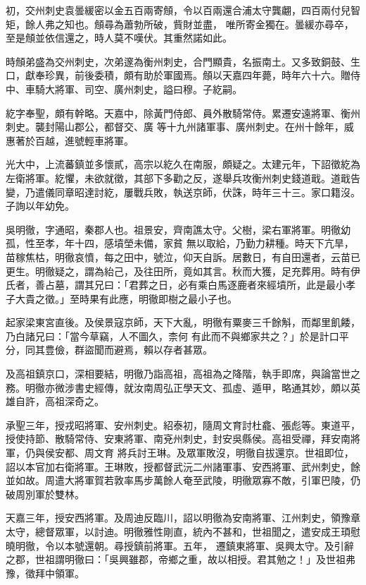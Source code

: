 \begin{pinyinscope}
 初，交州刺史袁曇緩密以金五百兩寄頠，令以百兩還合浦太守龔翽，四百兩付兒智矩，餘人弗之知也。頠尋為蕭勃所破，貲財並盡，
 唯所寄金獨在。曇緩亦尋卒，至是頠並依信還之，時人莫不嘆伏。其重然諾如此。



 時頠弟盛為交州刺史，次弟邃為衡州刺史，合門顯貴，名振南土。又多致銅鼓、生口，獻奉珍異，前後委積，頗有助於軍國焉。頠以天嘉四年薨，時年六十六。贈侍中、車騎大將軍、司空、廣州刺史，謚曰穆。子紇嗣。



 紇字奉聖，頗有幹略。天嘉中，除黃門侍郎、員外散騎常侍。累遷安遠將軍、衡州刺史。襲封陽山郡公，都督交、廣
 等十九州諸軍事、廣州刺史。在州十餘年，威惠著於百越，進號輕車將軍。



 光大中，上流蕃鎮並多懷貳，高宗以紇久在南服，頗疑之。太建元年，下詔徵紇為左衛將軍。紇懼，未欲就徵，其部下多勸之反，遂舉兵攻衡州刺史錢道戢。道戢告變，乃遣儀同章昭達討紇，屢戰兵敗，執送京師，伏誅，時年三十三。家口籍沒。子詢以年幼免。



 吳明徹，字通昭，秦郡人也。祖景安，齊南譙太守。父樹，梁右軍將軍。明徹幼孤，性至孝，年十四，感墳塋未備，家貧
 無以取給，乃勤力耕種。時天下亢旱，苗稼焦枯，明徹哀憤，每之田中，號泣，仰天自訴。居數日，有自田還者，云苗已更生。明徹疑之，謂為紿己，及往田所，竟如其言。秋而大獲，足充葬用。時有伊氏者，善占墓，謂其兄曰：「君葬之日，必有乘白馬逐鹿者來經墳所，此是最小孝子大貴之徵。」至時果有此應，明徹即樹之最小子也。



 起家梁東宮直後。及侯景寇京師，天下大亂，明徹有粟麥三千餘斛，而鄰里飢餧，乃白諸兄曰：「當今草竊，人不圖久，柰何
 有此而不與鄉家共之？」於是計口平分，同其豊儉，群盜聞而避焉，賴以存者甚眾。



 及高祖鎮京口，深相要結，明徹乃詣高祖，高祖為之降階，執手即席，與論當世之務。明徹亦微涉書史經傳，就汝南周弘正學天文、孤虛、遁甲，略通其妙，頗以英雄自許，高祖深奇之。



 承聖三年，授戎昭將軍、安州刺史。紹泰初，隨周文育討杜龕、張彪等。東道平，授使持節、散騎常侍、安東將軍、南兗州刺史，封安吳縣侯。高祖受禪，拜安南將軍，仍與侯安都、周文育
 將兵討王琳。及眾軍敗沒，明徹自拔還京。世祖即位，詔以本官加右衛將軍。王琳敗，授都督武沅二州諸軍事、安西將軍、武州刺史，餘並如故。周遣大將軍賀若敦率馬步萬餘人奄至武陵，明徹眾寡不敵，引軍巴陵，仍破周別軍於雙林。



 天嘉三年，授安西將軍。及周迪反臨川，詔以明徹為安南將軍、江州刺史，領豫章太守，總督眾軍，以討迪。明徹雅性剛直，統內不甚和，世祖聞之，遣安成王頊慰曉明徹，令以本號還朝。尋授鎮前將軍。五年，
 遷鎮東將軍、吳興太守。及引辭之郡，世祖謂明徹曰：「吳興雖郡，帝鄉之重，故以相授。君其勉之！」及世祖弗豫，徵拜中領軍。




\end{pinyinscope}
